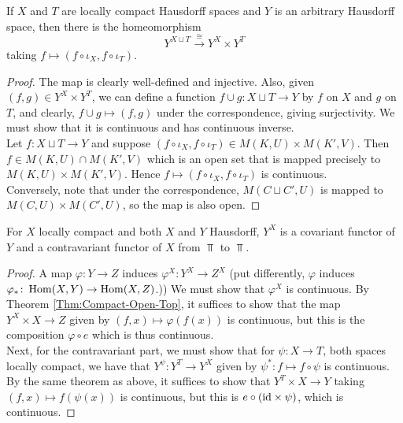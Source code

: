 \begin{proposition}[]
    If $X$ and $T$ are locally compact Hausdorff spaces
    and $Y$ is an arbitrary Hausdorff space, then there
    is the homeomorphism
    \[
    Y^{X \sqcup T} \stackrel{\cong}{\to} 
    Y^{X} \times Y^{T}
    \] 
    taking $f \mapsto \left( f \circ \iota_X,
    f \circ \iota_T \right) $.
\end{proposition}

\begin{proof}
    The map is clearly well-defined and
    injective. Also, given $\left( f,g \right) 
    \in Y^{X} \times Y^{T}$, we can
    define a function $f \cup  g\colon
    X \sqcup T \to Y$ by
    $f$ on $X$ and $g$ on $T$, and
    clearly,
    $f \cup g \mapsto (f,g)$ under the correspondence, giving
    surjectivity. We must show that
    it is continuous and has continuous inverse.\\
    Let $f \colon X \sqcup T \to Y$ and
    suppose $\left( 
    f \circ \iota_X , f \circ \iota_T \right) 
    \in M\left( K, U \right) \times 
    M\left( K', V \right)$.
    Then
    $f \in 
    M \left( K, U \right) \cap
    M\left( K', V \right)$ which is an open set
    that is mapped precisely to
    $M \left( K , U \right) \times 
    M \left( K', V \right) $. Hence
    $f\mapsto \left( f \circ \iota_X, f \circ \iota_T \right) $ 
    is continuous.\\

    Conversely, note that
     under the correspondence,
     $M\left( C \sqcup C',U \right) $ is mapped
     to
     $M(C, U) \times M(C',U)$, so
     the map is also open.
\end{proof}

\begin{theorem}[]
    For $X$ locally compact and both $X$ and $Y$ Hausdorff,
    $Y^{X}$ is a covariant functor of $Y$ and
    a contravariant functor of $X$
    from $\Top$ to $\Top$.
\end{theorem}



\begin{proof}
    A map $\varphi  \colon Y \to Z$ induces
    $\varphi^{X} \colon Y^{X} \to Z^{X}$ (put differently,
    $\varphi $ induces
    $\varphi_* \colon \operatorname{Hom} (X,Y) \to \operatorname{Hom}(X,Z)$.))
    We must show that $\varphi^{X}$ is continuous.
    By Theorem \ref{Thm:Compact-Open-Top}, it suffices
    to show that the map
    $Y^{X} \times X \to Z$ given by
    $\left( f,x \right) \mapsto \varphi \left( f(x) \right) $ 
    is continuous, but this is
    the composition $\varphi \circ e$ which is 
    thus continuous.\\
    Next, for the contravariant part, we must show that
    for $\psi \colon X \to T$, both spaces locally compact, we
    have that 
    $Y^{\psi } \colon Y^{T} \to Y^{X}$ given
    by $\psi^{*} \colon f \mapsto f \circ \psi $ is continuous.
    By the same theorem as above, it suffices to show that
    $Y^{T} \times X \to Y$ taking
    $\left( f,x \right) \mapsto f \left( \psi (x) \right) $ is
    continuous, but this is
    $e \circ \left( {\mathrm{id}} \times \psi  \right) $, which is
    continuous.
\end{proof}

